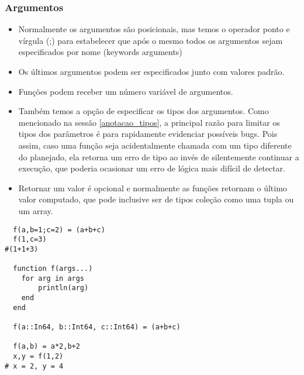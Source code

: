 \subsubsection{Argumentos}
\begin{itemize} %
    \item Normalmente os argumentos são posicionais, mas temos o operador ponto e vírgula (;) para estabelecer que após o mesmo todos os argumentos sejam especificados por nome (keywords arguments)
    \item Os últimos argumentos podem ser especificados junto com valores padrão.
    \item Funções podem receber um número variável de argumentos. 
    \item Também temos a opção de especificar os tipos dos argumentos.
    Como mencionado na sessão \ref{anotacao_tipos}, a principal razão para limitar os tipos dos parâmetros é para rapidamente evidenciar possíveis bugs. Pois assim, caso uma função seja acidentalmente chamada com um tipo diferente do planejado, ela retorna um erro de tipo ao invés de silentemente continuar a execução, que poderia ocasionar um erro de lógica mais difícil de detectar.
    \item Retornar um valor é opcional e normalmente as funções retornam o último valor computado, que pode inclusive ser de tipos coleção como uma tupla ou um array.
\end{itemize}
\begin{lstlisting}
  f(a,b=1;c=2) = (a+b+c) 
  f(1,c=3) 
#(1+1+3)

  function f(args...)
  	for arg in args
  		println(arg)
  	end
  end

  f(a::In64, b::Int64, c::Int64) = (a+b+c)

  f(a,b) = a*2,b+2
  x,y = f(1,2) 
# x = 2, y = 4
    
\end{lstlisting}

